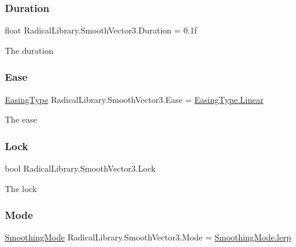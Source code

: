 \subsubsection{\texorpdfstring{Duration}{Duration}}
{\footnotesize\ttfamily float Radical\+Library.\+Smooth\+Vector3.\+Duration = 0.\+1f}



The duration 

\mbox{\label{class_radical_library_1_1_smooth_vector3_a4aed287600e7d2c12203d098556612d8}} 
\subsubsection{\texorpdfstring{Ease}{Ease}}
{\footnotesize\ttfamily \hyperlink{namespace_radical_library_a2d6877adaf2ec492cf30c572aa684e6f}{Easing\+Type} Radical\+Library.\+Smooth\+Vector3.\+Ease = \hyperlink{namespace_radical_library_a2d6877adaf2ec492cf30c572aa684e6fa32a843da6ea40ab3b17a3421ccdf671b}{Easing\+Type.\+Linear}}



The ease 

\mbox{\label{class_radical_library_1_1_smooth_vector3_a656550e3ddafe5b7315116de5f57d76f}} 
\subsubsection{\texorpdfstring{Lock}{Lock}}
{\footnotesize\ttfamily bool Radical\+Library.\+Smooth\+Vector3.\+Lock}



The lock 

\mbox{\label{class_radical_library_1_1_smooth_vector3_a8ae26fac85686d14a2a1dd56e3832077}} 
\subsubsection{\texorpdfstring{Mode}{Mode}}
{\footnotesize\ttfamily \hyperlink{namespace_radical_library_a53ca8c4ff40f917ad8d03bb2c0dbd548}{Smoothing\+Mode} Radical\+Library.\+Smooth\+Vector3.\+Mode = \hyperlink{namespace_radical_library_a53ca8c4ff40f917ad8d03bb2c0dbd548af276cc520db3c6e67c238feefa5130ab}{Smoothing\+Mode.\+lerp}}



